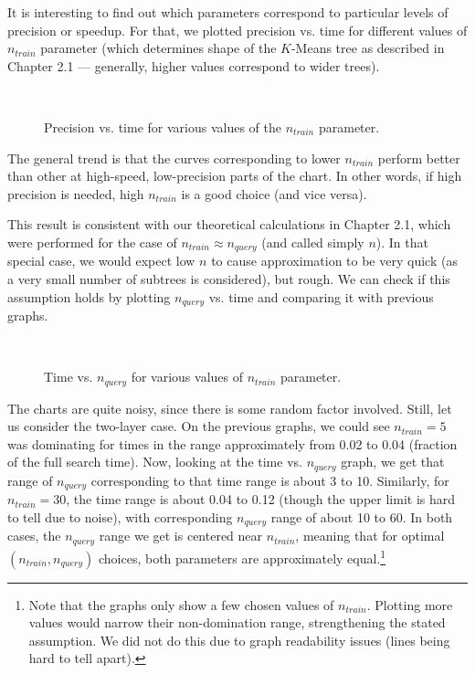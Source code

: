 It is interesting to find out which parameters correspond to particular levels
of precision or speedup. For that, we plotted precision vs. time for different
values of $n_{train}$ parameter (which determines shape of the $K$-Means tree as
described in Chapter 2.1 --- generally, higher values correspond to wider
trees).


\begin{figure}
	\centering
	\\
	\caption{Precision vs. time for various values of the $n_{train}$ parameter.}
\end{figure}

The general trend is that the curves corresponding to lower $n_{train}$ perform
better than other at high-speed, low-precision parts of the chart. In other
words, if high precision is needed, high $n_{train}$ is a good choice (and vice
versa).

This result is consistent with our theoretical calculations in Chapter 2.1, which
were performed for the case of $n_{train} \approx n_{query}$ (and called simply $n$).
In that special case, we would expect low $n$ to cause approximation to be very
quick (as a very small number of subtrees is considered), but rough. We can
check if this assumption holds by plotting $n_{query}$ vs. time and comparing
it with previous graphs.

\begin{figure}
	\centering
	\\
	\caption{Time vs. $n_{query}$ for various values of $n_{train}$ parameter.}
\end{figure}

The charts are quite noisy, since there is some random factor involved. Still,
let us consider the two-layer case. On the previous graphs, we could see 
$n_{train} = 5$ was dominating for times in the range approximately from 0.02 to 
0.04 (fraction of the full search time). Now, looking at the time vs. $n_{query}$ graph,
we get that range of $n_{query}$ corresponding to that time range is about
3 to 10. Similarly, for $n_{train} = 30$, the time range is about 0.04 to 0.12
(though the upper limit is hard to tell due to noise), with corresponding
$n_{query}$ range of about 10 to 60. In both cases, the $n_{query}$ range we
get is centered near $n_{train}$, meaning that for optimal 
$(n_{train}, n_{query})$ choices, both parameters are approximately 
equal.\footnote{
Note that the graphs only show a few chosen values of $n_{train}$. Plotting
more values would narrow their non-domination range, strengthening the 
stated assumption. We did not do this due to graph readability issues
(lines being hard to tell apart).
}
